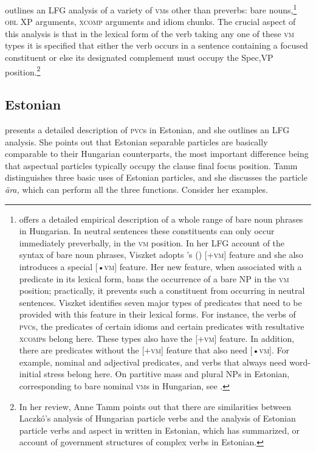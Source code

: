 \documentclass[output=paper,hidelinks]{langscibook}
\begin{document}
\newpage
\citet{laczko2014} outlines an LFG analysis of a variety of \textsc{vm}s other than preverbs: bare nouns,\footnote{\citet{Viszket2004} offers a detailed empirical description of a whole range of bare noun phrases in Hungarian. In neutral sentences these constituents can only occur immediately preverbally, in the \textsc{vm} position. In her LFG account of the syntax of bare noun phrases, Viszket adopts \citeauthor{Laczko95}'s (\citeyear{Laczko95,Laczko00}) [+\textsc{vm]} feature and she also introduces a special [•\textsc{vm]} feature. Her new feature, when associated with a predicate in its lexical form, bans the occurrence of a bare NP in the \textsc{vm} position; practically, it prevents such a constituent from occurring in neutral sentences. Viszket identifies seven major types of predicates that need to be provided with this feature in their lexical forms. For instance, the verbs of \textsc{pvc}s, the predicates of certain idioms and certain predicates with resultative \textsc{xcomp}s belong here. These types also have the [+\textsc{vm]} feature. In addition, there are predicates without the [+\textsc{vm]} feature that also need [•\textsc{vm].} For example, nominal and adjectival predicates, and verbs that always need word-initial stress belong here. On partitive mass and plural NPs in Estonian, corresponding to bare nominal \textsc{vm}s in Hungarian, see \citet{Tamm2007a,Tamm2007b}.} \textsc{obl} XP arguments, \textsc{xcomp} arguments and idiom chunks. The crucial aspect of this analysis is that in the lexical form of the verb taking any one of these \textsc{vm} types it is specified that either the verb occurs in a sentence containing a focused constituent or else its designated complement must occupy the Spec,VP position.\footnote{In her review, Anne Tamm points out that there are similarities between Laczkó's analysis of Hungarian particle verbs and the analysis of Estonian particle verbs and aspect in \citet{Ratsep1969} written in Estonian, which \citet[62--63,~72--75]{Tamm2012c} has summarized, or  account of government structures of complex verbs in Estonian.}

\subsection{Estonian}
\label{sec:FinnoUgric:3.2}

\citet{Tamm2004a} presents a detailed description of \textsc{pvc}s in Estonian, and she outlines an LFG analysis. She points out that Estonian separable particles are basically comparable to their Hungarian counterparts, the most important difference being that aspectual particles typically occupy the clause final focus position. Tamm distinguishes three basic uses of Estonian particles, and she discusses the particle \textit{ära,} which can perform all the three functions. Consider her examples.
\end{document}

